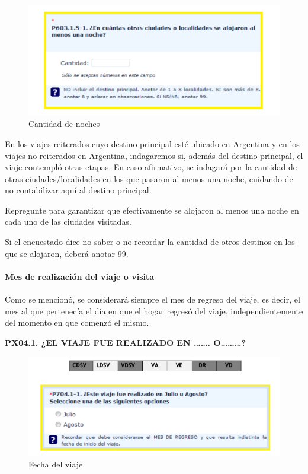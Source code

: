 \documentclass[
  openany]{book}
\begin{document}
\begin{figure}

{\centering \includegraphics[width=1\linewidth]{imagenes/figura6-85} 

}

\caption{Cantidad de noches}\label{fig:menosdeuna5}
\end{figure}

En los viajes reiterados cuyo destino principal esté ubicado en Argentina y en los viajes no reiterados en Argentina, indagaremos si, además del destino principal, el viaje contempló otras etapas. En caso afirmativo, se indagará por la cantidad de otras ciudades/localidades en los que pasaron al menos una noche, cuidando de no contabilizar aquí al destino principal.

Repregunte para garantizar que efectivamente se alojaron al menos una noche en cada uno de las ciudades visitadas.

Si el encuestado dice no saber o no recordar la cantidad de otros destinos en los que se alojaron, deberá anotar 99.

\hypertarget{mes-de-realizaciuxf3n-del-viaje-o-visita}{%
\paragraph{Mes de realización del viaje o visita}\label{mes-de-realizaciuxf3n-del-viaje-o-visita}}

Como se mencionó, se considerará siempre el mes de regreso del viaje, es decir, el mes al que pertenecía el día en que el hogar regresó del viaje, independientemente del momento en que comenzó el mismo.

\textbf{PX04.1. ¿EL VIAJE FUE REALIZADO EN \ldots\ldots. O\ldots\ldots\ldots?}

\begin{figure}

{\centering \includegraphics[width=1\linewidth]{imagenes/figura6-86} 

}

\caption{Fecha del viaje}\label{fig:date}
\end{figure}
\end{document}
